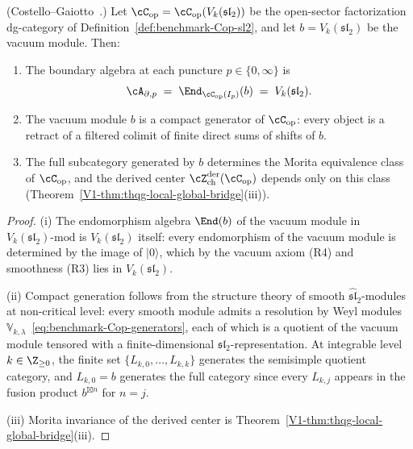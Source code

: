 \begin{proposition}
\label{prop:benchmark-boundary-algebra}
\textup{(Costello--Gaiotto~\cite{costello-gaiotto}.)}
Let\/ $\cC_{\mathrm{op}} = \cC_{\mathrm{op}}(V_k(\mathfrak{sl}_2))$
be the open-sector factorization dg-category of
Definition~\textup{\ref{def:benchmark-Cop-sl2}}, and let\/
$b = V_k(\mathfrak{sl}_2)$ be the vacuum module. Then:
\begin{enumerate}[label=\textup{(\roman*)}]
\item The boundary algebra at each puncture
 $p \in \{0, \infty\}$ is
 \begin{equation}\label{eq:benchmark-boundary-recovery}
 \cA_{\partial, p}
 \;=\;
 \End_{\cC_{\mathrm{op}}(I_p)}(b)
 \;=\;
 V_k(\mathfrak{sl}_2).
 \end{equation}
\item The vacuum module $b$ is a compact generator of\/
 $\cC_{\mathrm{op}}$: every object is a retract of a
 filtered colimit of finite direct sums of shifts of $b$.
\item The full subcategory generated by $b$ determines the
 Morita equivalence class of\/ $\cC_{\mathrm{op}}$, and
 the derived center
 $\cZ^{\mathrm{der}}_{\mathrm{ch}}(\cC_{\mathrm{op}})$
 depends only on this class
 \textup{(}Theorem~\textup{\ref*{V1-thm:thqg-local-global-bridge}(iii)}\textup{)}.
\end{enumerate}
\end{proposition}

\begin{proof}
(i) The endomorphism algebra $\End(b)$ of the vacuum module in
$V_k(\mathfrak{sl}_2)\text{-mod}$ is $V_k(\mathfrak{sl}_2)$ itself:
every endomorphism of the vacuum module is determined by the
image of $|0\rangle$, which by the vacuum axiom (R4) and
smoothness (R3) lies in $V_k(\mathfrak{sl}_2)$.

(ii) Compact generation follows from the structure theory of
smooth $\widehat{\mathfrak{sl}}_2$-modules at non-critical level:
every smooth module admits a resolution by Weyl modules
$\mathbb{V}_{k,\lambda}$~\eqref{eq:benchmark-Cop-generators},
each of which is a quotient of the vacuum module tensored with
a finite-dimensional $\mathfrak{sl}_2$-representation.
At integrable level $k \in \Z_{\ge 0}$, the finite set
$\{L_{k,0}, \ldots, L_{k,k}\}$ generates the semisimple
quotient category, and $L_{k,0} = b$ generates the full
category since every $L_{k,j}$ appears in the fusion product
$b^{\boxtimes n}$ for $n = j$.

(iii) Morita invariance of the derived center is
Theorem~\ref*{V1-thm:thqg-local-global-bridge}(iii).
\end{proof}

